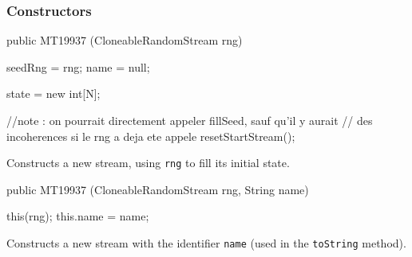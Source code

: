 \subsubsection* {Constructors}

\begin{code}
   public MT19937 (CloneableRandomStream rng) \begin{hide} {
      seedRng = rng;
      name = null;

      state = new int[N];

      //note : on pourrait directement appeler fillSeed, sauf qu'il y aurait
      //       des incoherences si le rng a deja ete appele
      resetStartStream();
   } \end{hide}
\end{code}
\begin{tabb} Constructs a new stream, using \texttt{rng} to fill its initial state.
\end{tabb}
\begin{htmlonly}
\end{htmlonly}
\begin{code}

   public MT19937 (CloneableRandomStream rng, String name) \begin{hide} {
      this(rng);
      this.name = name;
   } \end{hide}
\end{code}
\begin{tabb} Constructs a new stream with the identifier \texttt{name}
  (used in the \texttt{toString} method).
\end{tabb}
\begin{htmlonly}
\end{htmlonly}

